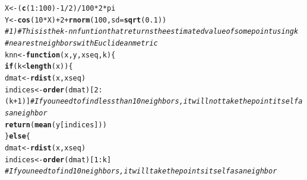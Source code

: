 \documentclass{article}\usepackage[]{graphicx}\usepackage[]{color}
\makeatletter
\newcommand{\hlnum}[1]{\textcolor[rgb]{0.686,0.059,0.569}{#1}}%
\newcommand{\hlcom}[1]{\textcolor[rgb]{0.678,0.584,0.686}{\textit{#1}}}%
\newcommand{\hlopt}[1]{\textcolor[rgb]{0,0,0}{#1}}%
\newcommand{\hlstd}[1]{\textcolor[rgb]{0.345,0.345,0.345}{#1}}%
\newcommand{\hlkwa}[1]{\textcolor[rgb]{0.161,0.373,0.58}{\textbf{#1}}}%
\newcommand{\hlkwb}[1]{\textcolor[rgb]{0.69,0.353,0.396}{#1}}%
\newcommand{\hlkwc}[1]{\textcolor[rgb]{0.333,0.667,0.333}{#1}}%
\newcommand{\hlkwd}[1]{\textcolor[rgb]{0.737,0.353,0.396}{\textbf{#1}}}%
\newenvironment{kframe}{%
 \def\at@end@of@kframe{}%
 \ifinner\ifhmode%
  \def\at@end@of@kframe{\end{minipage}}%
  \begin{minipage}{\columnwidth}%
 \fi\fi%
 \def\FrameCommand##1{\hskip\@totalleftmargin \hskip-\fboxsep
 \colorbox{shadecolor}{##1}\hskip-\fboxsep
     \hskip-\linewidth \hskip-\@totalleftmargin \hskip\columnwidth}%
 \MakeFramed {\advance\hsize-\width
   \@totalleftmargin\z@ \linewidth\hsize
   \@setminipage}}%
 {\par\unskip\endMakeFramed%
 \at@end@of@kframe}
\newenvironment{knitrout}{}{} %
\makeatother
\begin{document}
\begin{knitrout}
\begin{kframe}
{\ttfamily\noindent\itshape\color{messagecolor}{\#\# Loading required package: fields\\\#\# Loading required package: spam\\\#\# Loading required package: grid\\\#\# Spam version 0.40-0 (2013-09-11) is loaded.\\\#\# Type 'help( Spam)' or 'demo( spam)' for a short introduction \\\#\# and overview of this package.\\\#\# Help for individual functions is also obtained by adding the\\\#\# suffix '.spam' to the function name, e.g. 'help( chol.spam)'.\\\#\# \\\#\# Attaching package: 'spam'\\\#\# \\\#\# 下列对象被屏蔽了from 'package:base':\\\#\# \\\#\#\ \ \ \  backsolve, forwardsolve\\\#\# \\\#\# Loading required package: maps}}\begin{alltt}
\hlstd{X} \hlkwb{<-} \hlstd{(}\hlkwd{c}\hlstd{(}\hlnum{1}\hlopt{:}\hlnum{100}\hlstd{)} \hlopt{-} \hlnum{1}\hlopt{/}\hlnum{2}\hlstd{)}\hlopt{/}\hlnum{100} \hlopt{*} \hlnum{2} \hlopt{*} \hlstd{pi}
\hlstd{Y} \hlkwb{<-} \hlkwd{cos}\hlstd{(}\hlnum{10} \hlopt{*} \hlstd{X)} \hlopt{+} \hlnum{2} \hlopt{+} \hlkwd{rnorm}\hlstd{(}\hlnum{100}\hlstd{,} \hlkwc{sd} \hlstd{=} \hlkwd{sqrt}\hlstd{(}\hlnum{0.1}\hlstd{))}
\hlcom{# 1) # This is the k-nn funtion that returns the estimated value of some point using k}
\hlcom{# nearest neighbors with Euclidean metric}
\hlstd{knn} \hlkwb{<-} \hlkwa{function}\hlstd{(}\hlkwc{x}\hlstd{,} \hlkwc{y}\hlstd{,} \hlkwc{xseq}\hlstd{,} \hlkwc{k}\hlstd{) \{}
    \hlkwa{if} \hlstd{(k} \hlopt{<} \hlkwd{length}\hlstd{(x)) \{}
        \hlstd{dmat} \hlkwb{<-} \hlkwd{rdist}\hlstd{(x, xseq)}
        \hlstd{indices} \hlkwb{<-} \hlkwd{order}\hlstd{(dmat)[}\hlnum{2}\hlopt{:}\hlstd{(k} \hlopt{+} \hlnum{1}\hlstd{)]}  \hlcom{# If you need to find less than 10 neighbors, it will not take the point itself as a neighbor}
        \hlkwd{return}\hlstd{(}\hlkwd{mean}\hlstd{(y[indices]))}
    \hlstd{\}} \hlkwa{else} \hlstd{\{}
        \hlstd{dmat} \hlkwb{<-} \hlkwd{rdist}\hlstd{(x, xseq)}
        \hlstd{indices} \hlkwb{<-} \hlkwd{order}\hlstd{(dmat)[}\hlnum{1}\hlopt{:}\hlstd{k]}
        \hlcom{# If you need to find 10 neighbors, it will take the points itself as a neighbor}

\end{alltt}
\end{kframe}
\end{knitrout}
\end{document}
